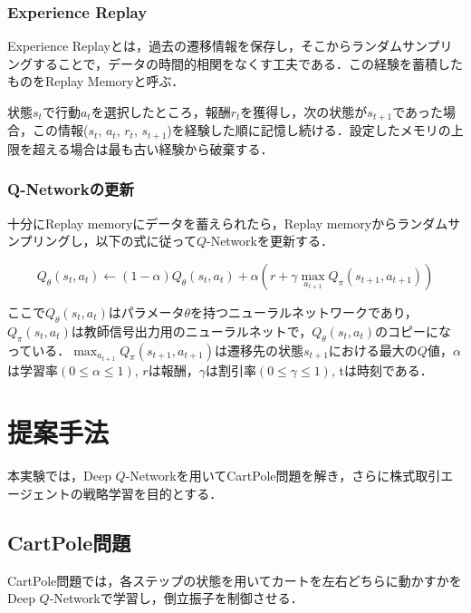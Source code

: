 \documentclass[twocolumn]{jarticle}
\begin{document}
        \subsubsection{Experience Replay}
        Experience Replayとは，過去の遷移情報を保存し，そこからランダムサンプリングすることで，データの時間的相関をなくす工夫である．この経験を蓄積したものをReplay Memoryと呼ぶ．
        
        状態$s_t$で行動$a_t$を選択したところ，報酬$r_t$を獲得し，次の状態が$s_{t+1}$であった場合，この情報($s_t$, $a_t$, $r_t$, $s_{t+1}$)を経験した順に記憶し続ける．設定したメモリの上限を超える場合は最も古い経験から破棄する．

        \subsubsection{Q-Networkの更新}
        十分にReplay memoryにデータを蓄えられたら，Replay memoryからランダムサンプリングし，以下の式に従って$Q$-Networkを更新する．

        \begin{equation}
            Q_\theta(s_t,a_t)\leftarrow(1-\alpha)Q_\theta(s_t,a_t)+\alpha(r+\gamma\max_{a_{t+1}}Q_\pi(s_{t+1},a_{t+1}))
        \end{equation}

        ここで$Q_\theta(s_t,a_t)$はパラメータ$\theta$を持つニューラルネットワークであり，$Q_\pi(s_t,a_t)$は教師信号出力用のニューラルネットで，$Q_\theta(s_t,a_t)$のコピーになっている．$\max_{a_{t+1}}Q_\pi(s_{t+1},a_{t+1})$は遷移先の状態$s_{t+1}$における最大の$Q$値，$\alpha$は学習率$(0\leq \alpha\leq 1)$, $r$は報酬，$\gamma$は割引率$(0\leq \gamma\leq 1)$, tは時刻である．


\section{提案手法}
本実験では，Deep $Q$-Networkを用いてCartPole問題を解き，さらに株式取引エージェントの戦略学習を目的とする．

    \subsection{CartPole問題}
        CartPole問題では，各ステップの状態を用いてカートを左右どちらに動かすかをDeep $Q$-Networkで学習し，倒立振子を制御させる．
\end{document}
